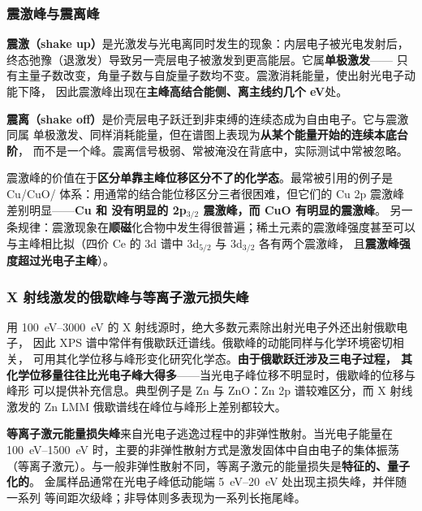 \subsubsection{震激峰与震离峰}

\textbf{震激（shake up）}是光激发与光电离同时发生的现象：内层电子被光电发射后，
终态弛豫（退激发）导致另一壳层电子被激发到更高能层。它属\textbf{单极激发}——
只有主量子数改变，角量子数与自旋量子数均不变。震激消耗能量，使出射光电子动能下降，
因此震激峰出现在\textbf{主峰高结合能侧、离主线约几个 eV}处。

\textbf{震离（shake off）}是价壳层电子跃迁到非束缚的连续态成为自由电子。它与震激同属
单极激发、同样消耗能量，但在谱图上表现为\textbf{从某个能量开始的连续本底台阶}，
而不是一个峰。震离信号极弱、常被淹没在背底中，实际测试中常被忽略。

\begin{keycond}
震激峰的价值在于\textbf{区分单靠主峰位移区分不了的化学态}。最常被引用的例子是
Cu/CuO/ 体系：用通常的结合能位移区分三者很困难，但它们的 Cu 2p 震激峰
差别明显——\textbf{Cu 和  没有明显的 2p$_{3/2}$ 震激峰，而 CuO 有明显的震激峰}。
另一条规律：震激现象在\textbf{顺磁}化合物中发生得很普遍；稀土元素的震激峰强度甚至可以
与主峰相比拟（四价 Ce 的 3d 谱中 3d$_{5/2}$ 与 3d$_{3/2}$ 各有两个震激峰，
且\textbf{震激峰强度超过光电子主峰}）。
\end{keycond}

\subsubsection{X 射线激发的俄歇峰与等离子激元损失峰}

用 \qtyrange{100}{3000}{eV} 的 X 射线源时，绝大多数元素除出射光电子外还出射俄歇电子，
因此 XPS 谱中常伴有俄歇跃迁谱线。俄歇峰的动能同样与化学环境密切相关，
可用其化学位移与峰形变化研究化学态。\textbf{由于俄歇跃迁涉及三电子过程，
其化学位移量往往比光电子峰大得多}——当光电子峰位移不明显时，俄歇峰的位移与峰形
可以提供补充信息。典型例子是 Zn 与 ZnO：Zn 2p 谱较难区分，而 X 射线激发的
Zn LMM 俄歇谱线在峰位与峰形上差别都较大。

\textbf{等离子激元能量损失峰}来自光电子逃逸过程中的非弹性散射。当光电子能量在
\qtyrange{100}{1500}{eV} 时，主要的非弹性散射方式是激发固体中自由电子的集体振荡
（等离子激元）。与一般非弹性散射不同，等离子激元的能量损失是\textbf{特征的、量子化的}。
金属样品通常在光电子峰低动能端 \qtyrange{5}{20}{eV} 处出现主损失峰，并伴随一系列
等间距次级峰；非导体则多表现为一系列长拖尾峰。


